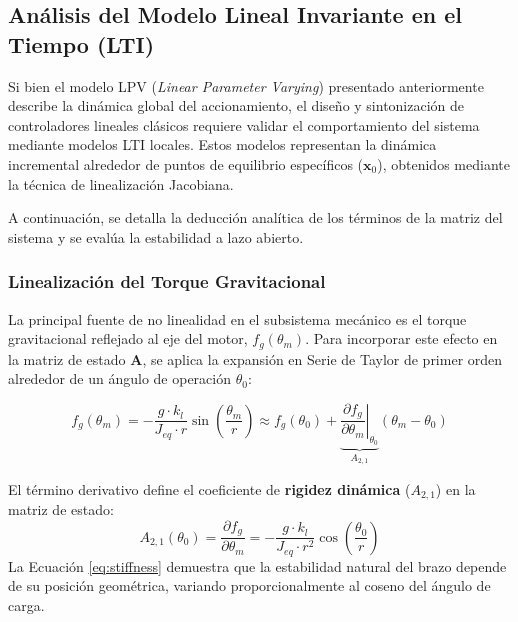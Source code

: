 

\subsection{Análisis del Modelo Lineal Invariante en el Tiempo (LTI)}
Si bien el modelo LPV (\textit{Linear Parameter Varying}) presentado anteriormente describe la dinámica global del accionamiento, el diseño y sintonización de controladores lineales clásicos requiere validar el comportamiento del sistema mediante modelos LTI locales. Estos modelos representan la dinámica incremental alrededor de puntos de equilibrio específicos ($\mathbf{x}_{0}$), obtenidos mediante la técnica de linealización Jacobiana.

A continuación, se detalla la deducción analítica de los términos de la matriz del sistema y se evalúa la estabilidad a lazo abierto.

\subsubsection{Linealización del Torque Gravitacional}
La principal fuente de no linealidad en el subsistema mecánico es el torque gravitacional reflejado al eje del motor, $f_g(\theta_m)$. Para incorporar este efecto en la matriz de estado $\mathbf{A}$, se aplica la expansión en Serie de Taylor de primer orden alrededor de un ángulo de operación $\theta_{0}$:

\begin{equation}
    f_g(\theta_m) = -\frac{g \cdot k_l}{J_{eq} \cdot r} \sin\left(\frac{\theta_m}{r}\right) \approx f_g(\theta_{0}) + \underbrace{\left. \frac{\partial f_g}{\partial \theta_m} \right|_{\theta_{0}}}_{A_{2,1}} (\theta_m - \theta_{0})
\end{equation}

El término derivativo define el coeficiente de \textbf{rigidez dinámica} ($A_{2,1}$) en la matriz de estado:
\begin{equation} \label{eq:stiffness}
    A_{2,1}(\theta_{0}) = \frac{\partial f_g}{\partial \theta_m} = -\frac{g \cdot k_l}{J_{eq} \cdot r^2} \cos\left(\frac{\theta_{0}}{r}\right)
\end{equation}
La Ecuación \eqref{eq:stiffness} demuestra que la estabilidad natural del brazo depende de su posición geométrica, variando proporcionalmente al coseno del ángulo de carga.

